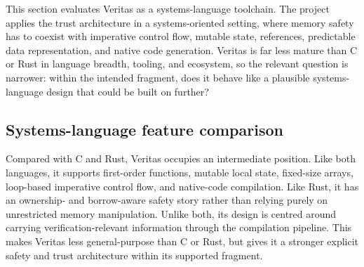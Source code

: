 This section evaluates Veritas as a systems-language toolchain. The project applies the trust architecture in a systems-oriented setting, where memory safety has to coexist with imperative control flow, mutable state, references, predictable data representation, and native code generation. Veritas is far less mature than C or Rust in language breadth, tooling, and ecosystem, so the relevant question is narrower: within the intended fragment, does it behave like a plausible systems-language design that could be built on further?


\subsection{Systems-language feature comparison}

Compared with C and Rust, Veritas occupies an intermediate position. Like both languages, it supports first-order functions, mutable local state, fixed-size arrays, loop-based imperative control flow, and native-code compilation. Like Rust, it has an ownership- and borrow-aware safety story rather than relying purely on unrestricted memory manipulation. Unlike both, its design is centred around carrying verification-relevant information through the compilation pipeline. This makes Veritas less general-purpose than C or Rust, but gives it a stronger explicit safety and trust architecture within its supported fragment.



